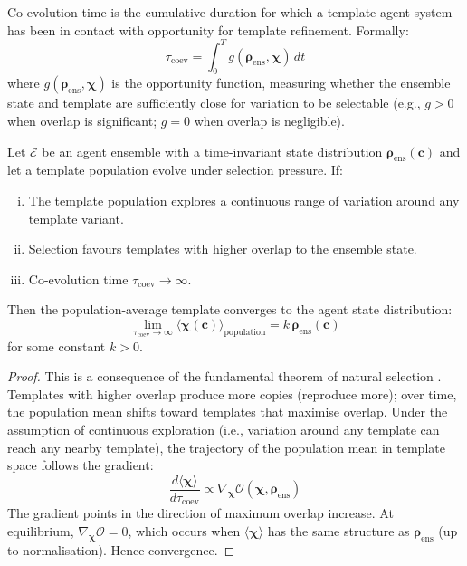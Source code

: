\documentclass[11pt,twocolumn,a4paper]{article}
\newcommand{\Template}{\boldsymbol{\chi}}
\newcommand{\State}{\boldsymbol{\rho}}
\newcommand{\Overlap}{\mathcal{O}}
\begin{document}
\begin{definition}
Co-evolution time is the cumulative duration for which a template-agent system has been in contact with opportunity for template refinement. Formally:
\begin{equation}
\tau_{\mathrm{coev}} = \int_0^T g(\State_{\mathrm{ens}}, \Template) \, dt
\label{eq:coev_time}
\end{equation}
where $g(\State_{\mathrm{ens}}, \Template)$ is the opportunity function, measuring whether the ensemble state and template are sufficiently close for variation to be selectable (e.g., $g > 0$ when overlap is significant; $g = 0$ when overlap is negligible).
\end{definition}

\begin{theorem}
\label{thm:template_convergence}
Let $\mathcal{E}$ be an agent ensemble with a time-invariant state distribution $\State_{\mathrm{ens}}(\mathbf{c})$ and let a template population evolve under selection pressure. If:
\begin{enumerate}[(i)]
\item The template population explores a continuous range of variation around any template variant.
\item Selection favours templates with higher overlap to the ensemble state.
\item Co-evolution time $\tau_{\mathrm{coev}} \to \infty$.
\end{enumerate}
Then the population-average template converges to the agent state distribution:
\begin{equation}
\lim_{\tau_{\mathrm{coev}} \to \infty} \langle \Template(\mathbf{c}) \rangle_{\mathrm{population}} = k \, \State_{\mathrm{ens}}(\mathbf{c})
\label{eq:convergence}
\end{equation}
for some constant $k > 0$.
\end{theorem}

\begin{proof}
This is a consequence of the fundamental theorem of natural selection \cite{fisher1930genetical}. Templates with higher overlap produce more copies (reproduce more); over time, the population mean shifts toward templates that maximise overlap. Under the assumption of continuous exploration (i.e., variation around any template can reach any nearby template), the trajectory of the population mean in template space follows the gradient:
\begin{equation}
\frac{d\langle \Template \rangle}{d\tau_{\mathrm{coev}}} \propto \nabla_{\Template} \Overlap(\Template, \State_{\mathrm{ens}})
\label{eq:coev_gradient}
\end{equation}
The gradient points in the direction of maximum overlap increase. At equilibrium, $\nabla_{\Template} \Overlap = 0$, which occurs when $\langle \Template \rangle$ has the same structure as $\State_{\mathrm{ens}}$ (up to normalisation). Hence convergence.
\end{proof}
\end{document}
